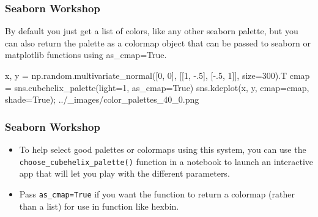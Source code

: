 \begin{frame}[fragile]
	\frametitle{Seaborn Workshop}
	\large
By default you just get a list of colors, like any other seaborn palette, but you can also return the palette as a colormap object that can be passed to seaborn or matplotlib functions using as_cmap=True.

x, y = np.random.multivariate_normal([0, 0], [[1, -.5], [-.5, 1]], size=300).T
cmap = sns.cubehelix_palette(light=1, as_cmap=True)
sns.kdeplot(x, y, cmap=cmap, shade=True);
../_images/color_palettes_40_0.png
\end{frame}
\begin{frame}[fragile]
\frametitle{Seaborn Workshop}
\large
\begin{itemize}
\item To help select good palettes or colormaps using this system, you can use the \texttt{choose\_cubehelix\_palette()} function in a notebook to launch an interactive app that will let you play with the different parameters. 
\item Pass \texttt{as\_cmap=True} if you want the function to return a colormap (rather than a list) for use in function like hexbin.
\end{itemize}

\end{frame}
